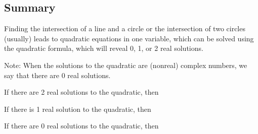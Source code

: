 \documentclass[space,handout,nooutcomes]{ximera}
\begin{document}
%
%
%


\subsection{Summary}
Finding the intersection of a line and a circle or the intersection of two circles (usually) leads to quadratic equations in one variable, which can be solved using the quadratic formula, which will reveal 0, 1, or 2 real solutions.  

Note: When the solutions to the quadratic are (nonreal) complex numbers, we say that there are 0 real solutions.  

\begin{question}
If there are 2 real solutions to the quadratic, then
\begin{multipleChoice}
\end{multipleChoice}
\end{question}

\begin{question}
If there is 1 real solution to the quadratic, then
\begin{multipleChoice}
\end{multipleChoice}
\end{question}

\begin{question}
If there are 0 real solutions to the quadratic, then
\begin{multipleChoice}
\end{multipleChoice}
\end{question}
\end{document}
